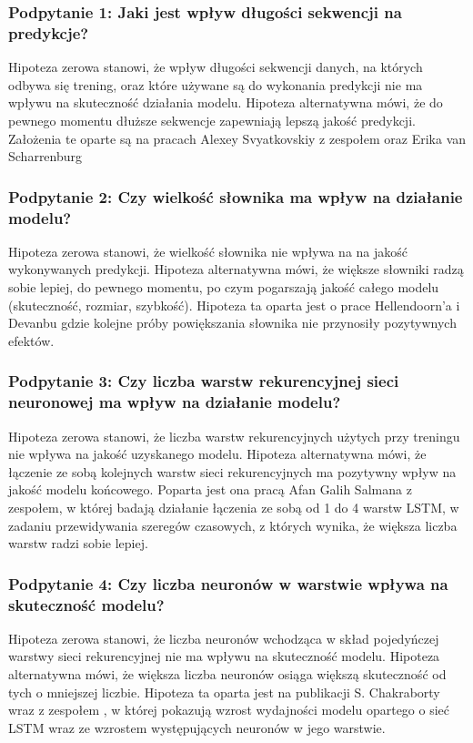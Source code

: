 \subsubsection{Podpytanie 1: Jaki jest wpływ długości sekwencji na predykcje?}
Hipoteza zerowa stanowi, że wpływ długości sekwencji danych, na których odbywa się trening, oraz które używane są do wykonania predykcji nie ma wpływu na skuteczność działania 
modelu. Hipoteza alternatywna mówi, że do pewnego momentu dłuższe sekwencje zapewniają lepszą jakość predykcji. Założenia te oparte są na pracach Alexey Svyatkovskiy z zespołem\cite{pythia}
oraz Erika van Scharrenburg \cite{erik}

\subsubsection{Podpytanie 2: Czy wielkość słownika ma wpływ na działanie modelu?}
Hipoteza zerowa stanowi, że wielkość słownika nie wpływa na na jakość wykonywanych predykcji. Hipoteza alternatywna mówi, że większe słowniki radzą sobie lepiej, do 
pewnego momentu, po czym pogarszają jakość całego modelu (skuteczność, rozmiar, szybkość). Hipoteza ta oparta jest o prace Hellendoorn'a i Devanbu \cite{hellendoorn}
gdzie kolejne próby powiększania słownika nie przynosiły pozytywnych efektów. 

\subsubsection{Podpytanie 3: Czy liczba warstw rekurencyjnej sieci neuronowej ma wpływ na działanie modelu?}
Hipoteza zerowa stanowi, że liczba warstw rekurencyjnych użytych przy treningu nie wpływa na jakość uzyskanego modelu. Hipoteza alternatywna mówi, że łączenie ze sobą 
kolejnych warstw sieci rekurencyjnych ma pozytywny wpływ na jakość modelu końcowego. Poparta jest ona pracą Afan Galih Salmana z zespołem\cite{multilstm}, w której 
badają działanie łączenia ze sobą od 1 do 4 warstw LSTM, w zadaniu przewidywania szeregów czasowych, z których wynika, że większa liczba warstw radzi sobie lepiej. 

\subsubsection{Podpytanie 4: Czy liczba neuronów w warstwie wpływa na skuteczność modelu?}
Hipoteza zerowa stanowi, że liczba neuronów wchodząca w skład pojedyńczej warstwy sieci rekurencyjnej nie ma wpływu na skuteczność modelu. Hipoteza alternatywna mówi, że 
większa liczba neuronów osiąga większą skuteczność od tych o mniejszej liczbie. Hipoteza ta oparta jest na publikacji S. Chakraborty wraz z zespołem \cite{numberofunits}, 
w której pokazują wzrost wydajności modelu opartego o sieć LSTM wraz ze wzrostem występujących neuronów w jego warstwie. 

